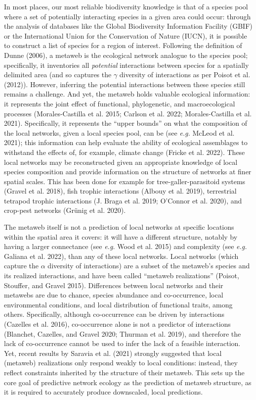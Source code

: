 \documentclass[
  letterpaper,
  DIV=11,
  numbers=noendperiod]{scrartcl}
\begin{document}
In most places, our most reliable biodiversity knowledge is that of a
species pool where a set of potentially interacting species in a given
area could occur: through the analysis of databases like the Global
Biodiversity Information Facility (GBIF) or the International Union for
the Conservation of Nature (IUCN), it is possible to construct a list of
species for a region of interest. Following the definition of Dunne
(2006), a metaweb is the ecological network analogue to the species
pool; specifically, it inventories all \emph{potential} interactions
between species for a spatially delimited area (and so captures the
\(\gamma\) diversity of interactions as per Poisot et al. (2012)).
However, inferring the potential interactions between these species
still remains a challenge. And yet, the metaweb holds valuable
ecological information: it represents the joint effect of functional,
phylogenetic, and macroecological processes (Morales-Castilla et al.
2015; Carlson et al. 2022; Morales-Castilla et al. 2021). Specifically,
it represents the ``upper bounds'' on what the composition of the local
networks, given a local species pool, can be (see \emph{e.g.} McLeod et
al. 2021); this information can help evaluate the ability of ecological
assemblages to withstand the effects of, for example, climate change
(Fricke et al. 2022). These local networks may be reconstructed given an
appropriate knowledge of local species composition and provide
information on the structure of networks at finer spatial scales. This
has been done for example for tree-galler-parasitoid systems (Gravel et
al. 2018), fish trophic interactions (Albouy et al. 2019), terrestrial
tetrapod trophic interactions (J. Braga et al. 2019; O'Connor et al.
2020), and crop-pest networks (Grünig et al. 2020).

The metaweb itself is not a prediction of local networks at specific
locations within the spatial area it covers: it will have a different
structure, notably by having a larger connectance (see \emph{e.g.} Wood
et al. 2015) and complexity (see \emph{e.g.} Galiana et al. 2022), than
any of these local networks. Local networks (which capture the
\(\alpha\) diversity of interactions) are a subset of the metaweb's
species and its realized interactions, and have been called ``metaweb
realizations'' (Poisot, Stouffer, and Gravel 2015). Differences between
local networks and their metawebs are due to chance, species abundance
and co-occurrence, local environmental conditions, and local
distribution of functional traits, among others. Specifically, although
co-occurrence can be driven by interactions (Cazelles et al. 2016),
co-occurrence alone is not a predictor of interactions (Blanchet,
Cazelles, and Gravel 2020; Thurman et al. 2019), and therefore the lack
of co-occurrence cannot be used to infer the lack of a feasible
interaction. Yet, recent results by Saravia et al. (2021) strongly
suggested that local (metaweb) realizations only respond weakly to local
conditions: instead, they reflect constraints inherited by the structure
of their metaweb. This sets up the core goal of predictive network
ecology as the prediction of metaweb structure, as it is required to
accurately produce downscaled, local predictions.
\end{document}
